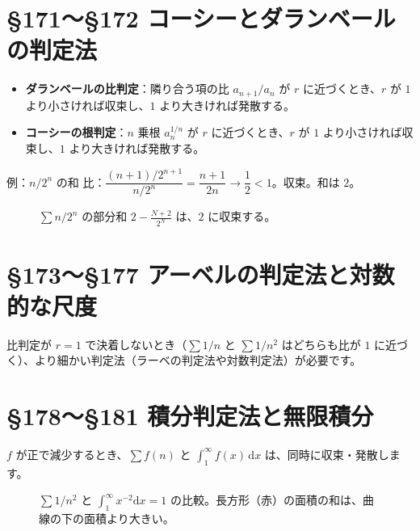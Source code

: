 \documentclass[a4paper,11pt,openany]{ltjsbook}
\newcommand{\dd}{\mathrm{d}}
\begin{document}
\section{§171〜§172 コーシーとダランベールの判定法}

\begin{itemize}[leftmargin=1.5em]
\item \textbf{ダランベールの比判定}：隣り合う項の比 $a_{n+1}/a_n$ が $r$ に近づくとき、$r$ が $1$ より小さければ収束し、$1$ より大きければ発散する。
\item \textbf{コーシーの根判定}：$n$ 乗根 $a_n^{1/n}$ が $r$ に近づくとき、$r$ が $1$ より小さければ収束し、$1$ より大きければ発散する。
\end{itemize}

\begin{examplebox}{例：$n/2^n$ の和}
比：$\dfrac{(n+1)/2^{n+1}}{n/2^n}=\dfrac{n+1}{2n}\to\dfrac12<1$。収束。和は $2$。
\end{examplebox}

\begin{figure}[htbp]
\centering
{}
\caption{$\sum n/2^n$ の部分和 $2-\frac{N+2}{2^N}$ は、$2$ に収束する。}
\end{figure}

\section{§173〜§177 アーベルの判定法と対数的な尺度}

比判定が $r=1$ で決着しないとき（$\sum1/n$ と $\sum1/n^2$ はどちらも比が $1$ に近づく）、より細かい判定法（ラーベの判定法や対数判定法）が必要です。

\section{§178〜§181 積分判定法と無限積分}

$f$ が正で減少するとき、$\sum f(n)$ と $\int_1^\infty f(x)\,\dd x$ は、同時に収束・発散します。

\begin{figure}[htbp]
\centering
{}
\caption{$\sum1/n^2$ と $\int_1^\infty x^{-2}\dd x=1$ の比較。長方形（赤）の面積の和は、曲線の下の面積より大きい。}
\end{figure}
\end{document}
